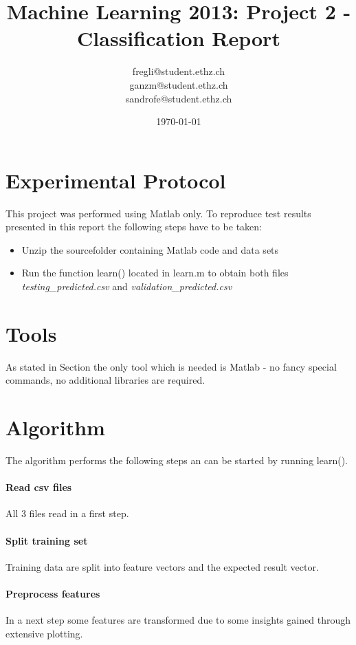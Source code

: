 \documentclass[a4paper, 11pt]{article}
\title{Machine Learning 2013: Project 2 - Classification Report}
\author{fregli@student.ethz.ch\\ ganzm@student.ethz.ch\\ sandrofe@student.ethz.ch\\}
\date{\today}
\begin{document}
\maketitle

\section*{Experimental Protocol}
\label{sec:exp-protocl}
This project was performed using Matlab only. To reproduce test results presented in this report the following steps have to be taken:

\begin{itemize}
\item Unzip the sourcefolder containing Matlab code and data sets
\item Run the function learn() located in learn.m to obtain both files \textit{testing\_predicted.csv} and \textit{validation\_predicted.csv}
\end{itemize}

\section{Tools}

As stated in Section  the only tool which is needed is Matlab - no fancy special commands, no additional libraries are required.

\section{Algorithm}

The algorithm performs the following steps an can be started by running learn().

\paragraph{Read csv files}
All 3 files read in a first step.

\paragraph{Split training set}
Training data are split into feature vectors and the expected result vector.

\paragraph{Preprocess features}
In a next step some features are transformed due to some insights gained through extensive plotting.
\end{document}
